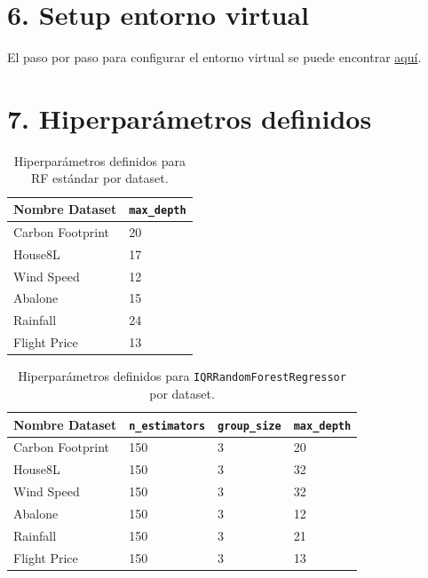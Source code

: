 \section*{6. Setup entorno virtual}
\label{appendix6}

El paso por paso para configurar el entorno virtual se puede encontrar \textcolor{blue}{\href{https://github.com/fedeegiorgi/proyecto-final/blob/main/setup.pdf}{aquí}}.

\section*{7. Hiperparámetros definidos}
\label{appendix7}

\begin{table}[h]
\centering
    \caption{Hiperparámetros definidos para RF estándar por dataset.}
\begin{tabularx}{\textwidth}{l X}
\toprule
\textbf{Nombre Dataset} & \textbf{\texttt{max\_depth}} \\
\midrule
Carbon Footprint & 20 \\
House8L & 17 \\
Wind Speed & 12 \\
Abalone & 15 \\
Rainfall & 24 \\
Flight Price & 13 \\
\bottomrule
\end{tabularx}
\end{table}

\begin{table}[h]
\centering
    \caption{Hiperparámetros definidos para \texttt{IQRRandomForestRegressor} por dataset.}
\begin{tabularx}{\textwidth}{l X X X}
\toprule
\textbf{Nombre Dataset} & \textbf{\texttt{n\_estimators}} & \textbf{\texttt{group\_size}} & \textbf{\texttt{max\_depth}} \\
\midrule
Carbon Footprint & 150 & 3 & 20 \\
House8L & 150 & 3 & 32 \\
Wind Speed & 150 & 3 & 32 \\
Abalone & 150 & 3 & 12 \\
Rainfall & 150 & 3 & 21 \\
Flight Price & 150 & 3 & 13 \\
\bottomrule
\end{tabularx}
\end{table}

